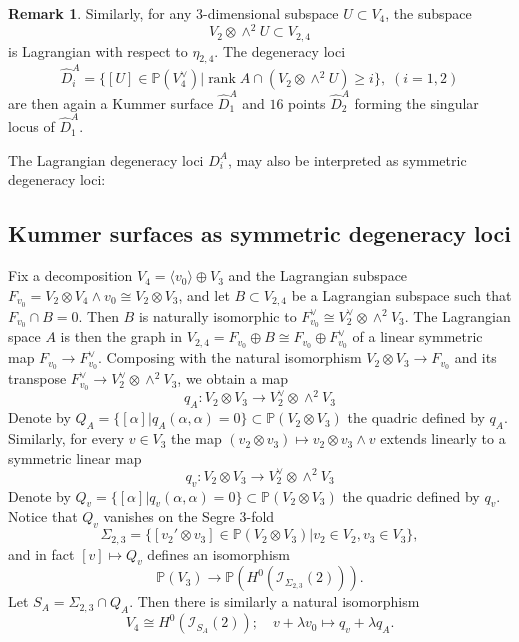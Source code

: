\documentclass[a4paper,11pt]{amsart}
\theoremstyle{definition}
\newtheorem{rem}[thm]{Remark}
\numberwithin{equation}{section}
\numberwithin{equation}{section} \theoremstyle{definition}
\begin{document}
 \begin{rem} Similarly, for any $3$-dimensional subspace $U\subset V_4$,  the subspace 
 \[
 V_2\otimes \wedge^2 U\subset V_{2,4}
 \]
  is Lagrangian with respect to $\eta_{2,4}$.  The degeneracy loci 
  \[
  \hat{D}_i^A= \{[U]\in {{\mathbb{P}}}(V_4^\vee)| \operatorname{rank} A \cap(V_2\otimes \wedge^2 U)\geq i\}, \;(i=1,2)
  \]
   are then again a Kummer surface $\hat{D}_1^A$ and $16$  points $\hat{D}_2^A$ forming the singular locus of $\hat{D}_1^A$. 
 \end{rem}
 The Lagrangian degeneracy loci $D_i^A$,  may also be interpreted as  symmetric degeneracy loci:
 
 \subsection{Kummer surfaces as symmetric degeneracy loci}
 Fix a decomposition $V_4=\langle v_0\rangle \oplus V_3$ and the Lagrangian subspace $F_{v_0}=V_2\otimes V_4\wedge v_0\cong V_2\otimes V_3$, and let $B\subset V_{2,4}$ be a Lagrangian subspace such that $F_{v_0}\cap B=0$.
 Then $B$ is naturally isomorphic to $F_{v_0}^\vee\cong V_2^\vee\otimes \wedge^2 V_3$.  
 The Lagrangian space $A$ is then the graph in $V_{2,4}=F_{v_0}\oplus B\cong F_{v_0}\oplus F_{v_0}^\vee$ of a  linear symmetric map $F_{v_0}\to F_{v_0}^\vee$.
 Composing with the natural isomorphism $V_2\otimes V_3\to F_{v_0}$ and its transpose $F_{v_0}^\vee\to V_2^\vee\otimes \wedge^2 V_3$, we obtain a map
 \[
 q_A: V_2\otimes V_3\to V_2^\vee\otimes \wedge^2 V_3
 \]
 Denote by $Q_A=\{[\alpha]| q_A(\alpha ,\alpha)=0\}\subset {{\mathbb{P}}}(V_2\otimes V_3)$ the quadric defined by $q_A$.
 Similarly, for every $v\in V_3$ the map $(v_2\otimes v_3)\mapsto v_2\otimes  v_3\wedge v$ extends linearly to a symmetric linear map
  \[
 q_v: V_2\otimes V_3\to V_2^\vee\otimes \wedge^2 V_3
 \]
Denote by $Q_v=\{[\alpha]| q_v(\alpha ,\alpha)=0\}\subset {{\mathbb{P}}}(V_2\otimes V_3)$ the quadric defined by $q_v$.
  Notice that  $Q_v$  vanishes on the Segre $3$-fold 
  \[
  \Sigma_{2,3}=\{[v_2'\otimes v_3]\in {{\mathbb{P}}}(V_2\otimes V_3)|v_2\in V_2, v_3\in V_3\},
  \]
  and in fact 
  $[v]\mapsto Q_v$ defines an isomorphism 
  \[
  {{\mathbb{P}}}(V_3)\to {{\mathbb{P}}}(H^0({\mathcal I}_{\Sigma_{2,3}}(2))).
  \]
Let $S_A=\Sigma_{2,3}\cap Q_A$. Then there is similarly a natural isomorphism
\[
V_4\cong H^0({\mathcal I}_{S_A}(2));\quad  v+\lambda v_0\mapsto  q_v+\lambda q_A.
\]
 
\end{document}
